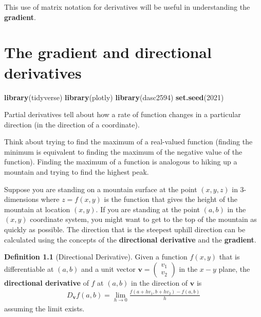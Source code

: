 \documentclass[
]{book}
\newenvironment{Shaded}{\begin{snugshade}}{\end{snugshade}}
\newcommand{\DecValTok}[1]{\textcolor[rgb]{0.00,0.00,0.81}{#1}}
\newcommand{\KeywordTok}[1]{\textcolor[rgb]{0.13,0.29,0.53}{\textbf{#1}}}
\newcommand{\NormalTok}[1]{#1}
\theoremstyle{definition}
\newtheorem{definition}{Definition}[chapter]
\theoremstyle{definition}
\theoremstyle{definition}
\theoremstyle{remark}
\begin{document}
This use of matrix notation for derivatives will be useful in understanding the \textbf{gradient}.

\hypertarget{the-gradient-and-directional-derivatives}{%
\chapter{The gradient and directional derivatives}\label{the-gradient-and-directional-derivatives}}

\begin{Shaded}
\begin{Highlighting}[]
\KeywordTok{library}\NormalTok{(tidyverse)}
\KeywordTok{library}\NormalTok{(plotly)}
\KeywordTok{library}\NormalTok{(dasc2594)}
\KeywordTok{set.seed}\NormalTok{(}\DecValTok{2021}\NormalTok{)}
\end{Highlighting}
\end{Shaded}

Partial derivatives tell about how a rate of function changes in a particular direction (in the direction of a coordinate).

Think about trying to find the maximum of a real-valued function (finding the minimum is equivalent to finding the maximum of the negative value of the function). Finding the maximum of a function is analogous to hiking up a mountain and trying to find the highest peak.

Suppose you are standing on a mountain surface at the point \((x, y, z)\) in 3-dimensions where \(z = f(x, y)\) is the function that gives the height of the mountain at location \((x, y)\). If you are standing at the point \((a, b)\) in the \((x, y)\) coordinate system, you might want to get to the top of the mountain as quickly as possible. The direction that is the steepest uphill direction can be calculated using the concepts of the \textbf{directional derivative} and the \textbf{gradient}.

\begin{definition}[Directional Derivative]
\protect\hypertarget{def:unnamed-chunk-287}{}{\label{def:unnamed-chunk-287} {} }Given a function \(f(x,y)\) that is differentiable at \((a, b)\) and a unit vector \(\mathbf{v} = \begin{pmatrix} v_1 \\ v_2 \end{pmatrix}\) in the \(x-y\) plane, the \textbf{directional derivative} of \(f\) at \((a, b)\) in the direction of \(\mathbf{v}\) is
\[
\begin{aligned}
D_{\mathbf{v}} f(a, b) = \lim_{h \rightarrow 0} \frac{f(a + h v_1, b + h v_2) - f(a, b)}{h}
\end{aligned}
\]
assuming the limit exists.
\end{definition}
\end{document}
